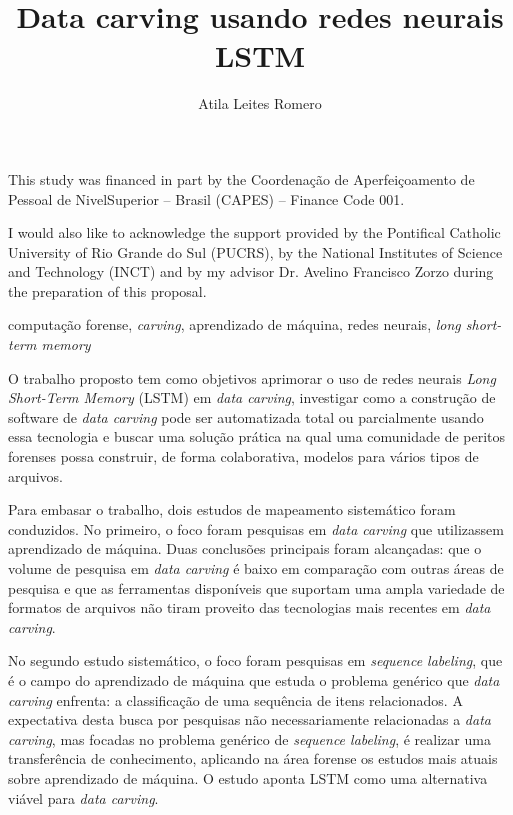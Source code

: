 \documentclass[english,oneside]{pucrs-ppgcc}
\author{Atila Leites Romero}
\title{Data carving usando redes neurais LSTM}
      {Data carving using LSTM neural networks}
\begin{document}
%


\begin{agradecimentos}
This study was financed in part by the Coordenação de Aperfeiçoamento de Pessoal de NivelSuperior – Brasil (CAPES) – Finance Code 001.

I would also like to acknowledge the support provided by the Pontifical Catholic University of Rio Grande do Sul (PUCRS), by the National Institutes of Science and Technology (INCT) and by my advisor Dr. Avelino Francisco Zorzo during the preparation of this proposal.

\end{agradecimentos}

\begin{resumo}{computação forense, \textit{carving}, aprendizado de máquina, redes neurais, \textit{long short-term memory}}

O trabalho proposto tem como objetivos aprimorar o uso de redes neurais \textit{Long Short-Term Memory} (LSTM) em \textit{data carving}, investigar como a construção de software de \textit{data carving} pode ser automatizada total ou parcialmente usando essa tecnologia e buscar uma solução prática na qual uma comunidade de peritos forenses possa construir, de forma colaborativa, modelos para vários tipos de arquivos.


Para embasar o  trabalho, dois estudos de mapeamento sistemático foram conduzidos.
No primeiro, o foco foram pesquisas em \textit{data carving} que utilizassem aprendizado de máquina. Duas conclusões principais foram alcançadas: que o volume de pesquisa em \textit{data carving} é baixo em comparação com outras áreas de pesquisa e que as ferramentas disponíveis que suportam uma ampla variedade de formatos de arquivos não tiram proveito das tecnologias mais recentes em \textit{data carving}.

No segundo estudo sistemático, o foco foram pesquisas em \textit{sequence labeling}, que é o campo do aprendizado de máquina que estuda o problema genérico que \textit{data carving} enfrenta: a classificação de uma sequência de itens relacionados. A expectativa desta busca por pesquisas não necessariamente relacionadas a \textit{data carving}, mas focadas no problema genérico de \textit{sequence labeling}, é realizar uma transferência de conhecimento, aplicando na área forense os estudos mais atuais sobre aprendizado de máquina. O estudo aponta LSTM como uma alternativa viável para \textit{data carving}.

\end{resumo}
\end{document}
